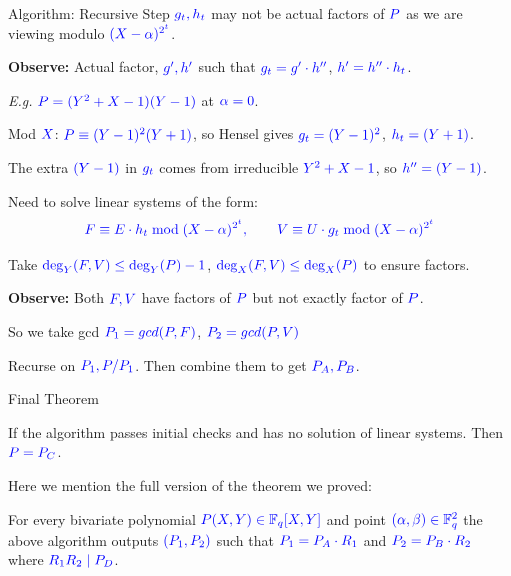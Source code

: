\documentclass[10pt,handout]{beamer}
\begin{document}
\begin{frame}{Algorithm: Recursive Step}
	$\textcolor{blue}{\textcolor{blue}{g_t,h_t}}$ may not be actual factors of $\textcolor{blue}{\textcolor{blue}{P}}$ as we are viewing modulo $\textcolor{blue}{\textcolor{blue}{(X-\alpha)^{2^t}}}$. \pause

	\textbf{Observe:} Actual factor, $\textcolor{blue}{\textcolor{blue}{g',h'}}$ such that $\textcolor{blue}{\textcolor{blue}{g_t=g'\cdot h''}}$, $\textcolor{blue}{\textcolor{blue}{h'=h''\cdot h_t}}$. \pause

	\textit{E.g.} $\textcolor{blue}{\textcolor{blue}{P=(Y^2+X-1)(Y-1)}}$ at $\textcolor{blue}{\textcolor{blue}{\alpha=0}}$.\pause

	Mod $\textcolor{blue}{\textcolor{blue}{X}}$: $\textcolor{blue}{\textcolor{blue}{P \equiv (Y-1)^2(Y+1)}}$, so Hensel gives $\textcolor{blue}{\textcolor{blue}{g_t=(Y-1)^2}}$, $\textcolor{blue}{\textcolor{blue}{h_t=(Y+1)}}$.

	The extra $\textcolor{blue}{\textcolor{blue}{(Y-1)}}$ in $\textcolor{blue}{\textcolor{blue}{g_t}}$ comes from irreducible $\textcolor{blue}{\textcolor{blue}{Y^2+X-1}}$, so $\textcolor{blue}{\textcolor{blue}{h''=(Y-1)}}$.\pause

	Need to solve linear systems of the form:
	$$\textcolor{blue}{\textcolor{blue}{F\equiv E\cdot h_t \bmod{(X-\alpha)^{2^t}},\qquad V\equiv U\cdot g_t \bmod{(X-\alpha)^{2^t}}}}$$\pause

	Take $\textcolor{blue}{\textcolor{blue}{\deg_Y(F,V)\leq \deg_Y(P)-1}}$, $\textcolor{blue}{\textcolor{blue}{\deg_X(F,V)\leq \deg_X(P)}}$ to ensure factors. 

	\textbf{Observe:} Both $\textcolor{blue}{\textcolor{blue}{F,V}}$ have factors of $\textcolor{blue}{\textcolor{blue}{P}}$ but not exactly factor of $\textcolor{blue}{\textcolor{blue}{P}}$. \pause

	So we take gcd $\textcolor{blue}{\textcolor{blue}{P_1=gcd(P,F)}}$, $\textcolor{blue}{\textcolor{blue}{P_2=gcd(P,V)}}$\pause

	Recurse on $\textcolor{blue}{\textcolor{blue}{P_1, P/P_1}}$. Then combine them to get $\textcolor{blue}{\textcolor{blue}{P_A, P_B}}$.
	
\end{frame}
\begin{frame}{Final Theorem}
	\begin{lemma}
		If the algorithm passes initial checks and has no solution of linear systems. Then $\textcolor{blue}{\textcolor{blue}{P=P_C}}$.
	\end{lemma}\pause
	Here we mention the full version of the theorem we proved:\vfill

	\begin{theorem}
		For every bivariate polynomial $\textcolor{blue}{\textcolor{blue}{P(X,Y)\in\mathbb{F}_q[X,Y]}}$ and point $\textcolor{blue}{\textcolor{blue}{(\alpha,\beta)\in\mathbb{F}_q^2}}$ the above algorithm outputs $\textcolor{blue}{\textcolor{blue}{(P_1,P_2)}}$ such that
		$\textcolor{blue}{\textcolor{blue}{P_1=P_A\cdot R_1}}$ and $\textcolor{blue}{\textcolor{blue}{P_2=P_B\cdot R_2}}$ where $\textcolor{blue}{\textcolor{blue}{R_1R_2\mid P_D}}$.
	\end{theorem}
\end{frame}
\end{document}
